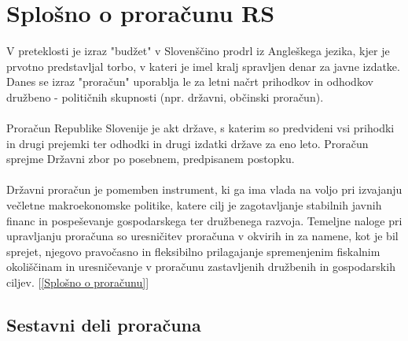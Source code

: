 \documentclass[12pt, a4paper]{article}
\begin{document}
\section[Splošno o proračunu RS]{Splošno o proračunu RS}
V preteklosti je izraz "budžet" v Slovenščino prodrl iz Angleškega jezika, kjer je prvotno predstavljal torbo, v kateri je imel kralj spravljen denar za javne izdatke. \\
Danes se izraz "proračun" uporablja le za letni načrt prihodkov in odhodkov družbeno - političnih skupnosti (npr. državni, občinski proračun).
 \\
\\
Proračun Republike Slovenije je akt države, s katerim so predvideni vsi prihodki in drugi prejemki ter odhodki in drugi izdatki države za eno leto. Proračun sprejme Državni zbor po posebnem, predpisanem postopku.
\\
\\
Državni proračun je pomemben instrument, ki ga ima vlada na voljo pri izvajanju večletne makroekonomske politike, katere cilj je zagotavljanje stabilnih javnih financ in pospeševanje gospodarskega ter družbenega razvoja. Temeljne naloge pri upravljanju proračuna so uresničitev proračuna v okvirih in za namene, kot je bil sprejet, njegovo pravočasno in fleksibilno prilagajanje spremenjenim fiskalnim okoliščinam in uresničevanje v proračunu zastavljenih družbenih in gospodarskih ciljev. [\ref{Splošno o proračunu}]

\subsection[Sestavni deli proračuna]{Sestavni deli proračuna}
\end{document}
